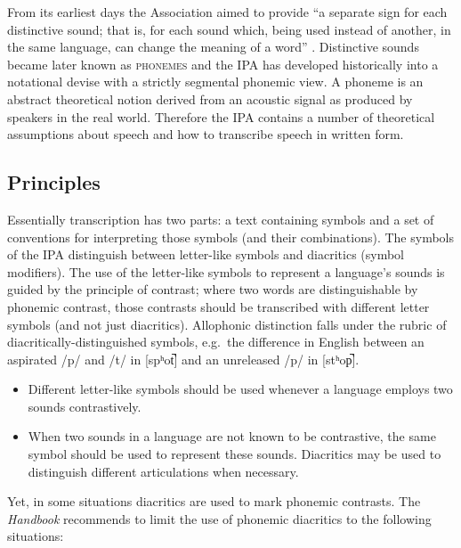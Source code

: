 \noindent From its earliest days the Association aimed to provide ``a separate sign for
each distinctive sound; that is, for each sound which, being used instead of
another, in the same language, can change the meaning of a word''
\citep[27]{IPA1999}. Distinctive sounds became later known as \textsc{phonemes}
and the IPA has developed historically into a notational devise with a strictly
segmental phonemic view. A phoneme is an abstract theoretical notion derived
from an acoustic signal as produced by speakers in the real world. Therefore the
IPA contains a number of theoretical assumptions about speech and how to
transcribe speech in written form. 


\subsection*{Principles}
\label{IPAprinciples}

Essentially transcription has two parts: a text containing symbols and a set 
of conventions for interpreting those symbols (and their combinations). 
The symbols of the IPA distinguish between letter-like symbols and
diacritics (symbol modifiers). The use of the letter-like symbols to represent 
a language's sounds is guided by the principle of contrast; where two words 
are distinguishable by phonemic contrast, those contrasts should be transcribed 
with different letter symbols (and not just diacritics). Allophonic distinction 
falls under the rubric of diacritically-distinguished symbols, e.g.\ the 
difference in English between an aspirated /p/ and /t/ in [spʰot̚] and 
an unreleased /p/ in [stʰop̚]. 

\begin{itemize}

	\item Different letter-like symbols should be used whenever
          a language employs two sounds contrastively.
	\item When two sounds in a language are not known to be contrastive, the same
          symbol should be used to represent these sounds. Diacritics may
          be used to distinguish different articulations when necessary.
\end{itemize}          
          
\noindent Yet, in some situations diacritics are used to mark phonemic
contrasts. The \textit{Handbook} recommends to limit the use of phonemic
diacritics to the following situations: 

